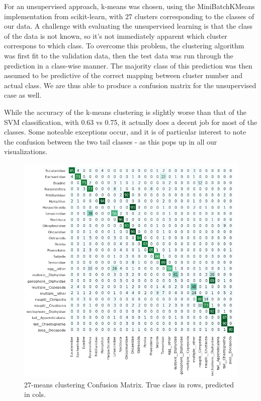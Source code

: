 \documentclass[10pt]{article}
\begin{document}
For an unsupervised approach, k-means was chosen, using the MiniBatchKMeans implementation from scikit-learn, with 27 clusters corresponding to the classes of our data. A challenge with evaluating the unsupervised learning is that the class of the data is not known, so it's not immediately apparent which cluster correspons to which class. To overcome this problem, the clustering algorithm was first fit to the validation data, then the test data was run through the prediction in a class-wise manner. The majority class of this prediction was then assumed to be predictive of the correct mapping between cluster number and actual class. We are thus able to produce a confusion matrix for the unsupervised case as well.

While the accuracy of the k-means clustering is slightly worse than that of the SVM classification, with 0.63 vs 0.75, it actually does a decent job for most of the classes. Some noteable exceptions occur, and it is of particular interest to note the confusion between the two tail classes - as this pops up in all our visualizations.

\begin{figure}
\includegraphics[scale=.55]{kmeans.png}
\caption{27-means clustering Confusion Matrix. True class in rows, predicted in cols.}
\end{figure}
\end{document}
